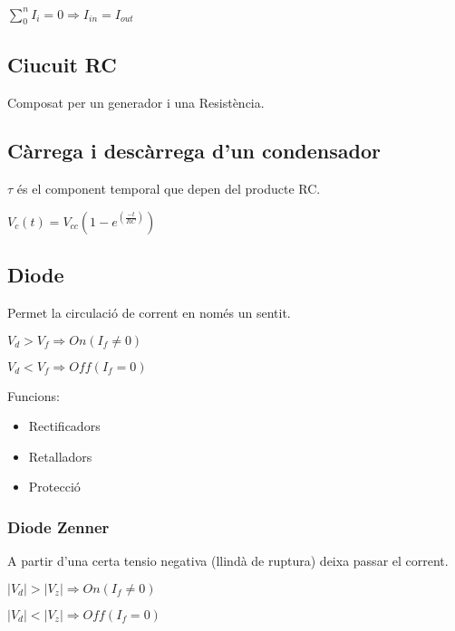 \documentclass{article}
\begin{document}
$\sum_0^nI_i = 0 \Rightarrow I_{in} = I_{out}$

\subsection{Ciucuit RC}

Composat per un generador i una Resistència.

\subsection{Càrrega i descàrrega d'un condensador}

$\tau$ és el component temporal que depen del producte RC.

$V_c(t) = V_{cc}(1-e^(\frac{-t}{RC}))$

\subsection{Diode}

Permet la circulació de corrent en només un sentit.

$V_d > V_f \Rightarrow On (I_f \neq 0)$

$V_d < V_f \Rightarrow Off (I_f = 0)$

Funcions:
\begin{itemize}
	\item Rectificadors
	\item Retalladors
	\item Protecció
\end{itemize}

\subsubsection{Diode Zenner}

A partir d'una certa tensio negativa (llindà de ruptura) deixa passar el corrent.

$|V_d| > |V_z| \Rightarrow On (I_f \neq 0)$

$|V_d| < |V_z| \Rightarrow Off (I_f = 0)$
\end{document}
